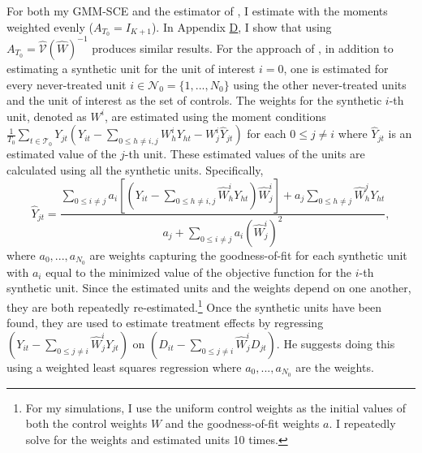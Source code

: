 \documentclass{article}
\begin{document}
For both my GMM-SCE and the estimator of \cite{Powell2021}, I estimate with the moments weighted evenly ($A_{T_0} = I_{K+1}$). In Appendix \hyperref[ApD]{D}, I show that using $A_{T_0} = \hat{\mathcal{V}}(\hat{W})^{-1}$  produces similar results. For the approach of \cite{Powell2021}, in addition to estimating a synthetic unit for the unit of interest $i=0$, one is estimated for every never-treated unit $i \in \mathcal{N}_0 = \{1,...,N_0\}$ using the other never-treated units and the unit of interest as the set of controls. The weights for the synthetic $i$-th unit, denoted as $W^i$, are estimated using the moment conditions $\frac{1}{T_0}\sum_{t \in \mathcal{T}_0}Y_{jt}(Y_{it} - \sum_{ 0 \leq h \ne i,j} W_h^i Y_{ht} - W_j^i \hat{Y}_{jt})$ for each $0 \leq j \ne i$ where $\hat{Y}_{jt}$ is an estimated value of the $j$-th unit. These estimated values of the units are calculated using all the synthetic units. Specifically,
$$\hat{Y}_{jt} = \frac{\sum_{0 \leq i \ne j}a_i [(Y_{it} - \sum_{0 \leq h \ne i,j} \hat{W}_h^i Y_{ht})\hat{W}_j^i] + a_j \sum_{0 \leq h \ne j} \hat{W}_h^j Y_{ht}}{a_j + \sum_{0 \leq i \ne j} a_i (\hat{W}_j^i)^2},$$
where $a_0, ..., a_{N_0}$ are weights capturing the goodness-of-fit for each synthetic unit with $a_i$ equal to the minimized value of the objective function for the $i$-th synthetic unit. Since the estimated units and the weights depend on one another, they are both repeatedly re-estimated.\footnote{For my simulations, I use the uniform control weights as the initial values of both the control weights $W$ and the goodness-of-fit weights $a$. I repeatedly solve for the weights and estimated units 10 times.} Once the synthetic units have been found, they are used to estimate treatment effects by regressing $(Y_{it} - \sum_{0 \leq j \ne i} \hat{W}_j^i Y_{jt})$ on $(D_{it} - \sum_{0 \leq j \ne i} \hat{W}_j^i D_{jt})$. He suggests doing this using a weighted least squares regression where $a_0, ..., a_{N_0}$ are the weights.
 \par
\end{document}
